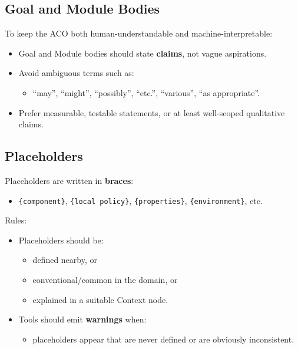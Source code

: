 \documentclass[11pt]{article}
\begin{document}
\subsection{Goal and Module Bodies}

To keep the ACO both human-understandable and machine-interpretable:
\begin{itemize}[leftmargin=2em]
  \item Goal and Module bodies should state \textbf{claims}, not vague aspirations.
  \item Avoid ambiguous terms such as:
  \begin{itemize}[leftmargin=1.5em]
    \item ``may'', ``might'', ``possibly'', ``etc.'', ``various'', ``as appropriate''.
  \end{itemize}
  \item Prefer measurable, testable statements, or at least well-scoped qualitative claims.
\end{itemize}

\subsection{Placeholders}

Placeholders are written in \textbf{braces}:
\begin{itemize}[leftmargin=2em]
  \item \texttt{\{component\}}, \texttt{\{local policy\}}, \texttt{\{properties\}}, \texttt{\{environment\}}, etc.
\end{itemize}

Rules:
\begin{itemize}[leftmargin=2em]
  \item Placeholders should be:
  \begin{itemize}[leftmargin=1.5em]
    \item defined nearby, or
    \item conventional/common in the domain, or
    \item explained in a suitable Context node.
  \end{itemize}
  \item Tools should emit \textbf{warnings} when:
  \begin{itemize}[leftmargin=1.5em]
    \item placeholders appear that are never defined or are obviously inconsistent.
  \end{itemize}
\end{itemize}
\end{document}
